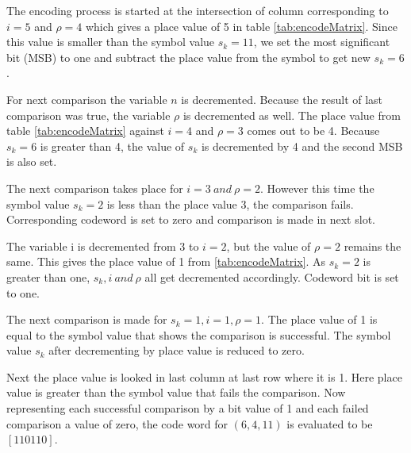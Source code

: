 \begin{list}{}{}
\item The encoding process is started at the intersection of column corresponding to $i=5$ and $\rho=4$ which gives a place value of 5 in table \ref{tab:encodeMatrix}. Since this value is smaller than the symbol value $s_k=11$, we set the most significant bit (MSB) to one and subtract the place value from the symbol to get new $s_k=6$. 

\item For next comparison the variable $n$ is decremented. Because the result of last comparison was true, the variable $\rho$ is decremented as well. The place value from table \ref{tab:encodeMatrix} against $i=4$ and $\rho=3$ comes out to be 4. Because $s_k=6$ is greater than 4, the value of $s_k$ is decremented by 4 and the second MSB is also set.

\item The next comparison takes place for $i=3~and~\rho=2$. However this time the symbol value $s_k=2$ is less than the place value 3, the comparison fails. Corresponding codeword is set to zero and comparison is made in next slot.

\item The variable i is decremented from 3 to $i=2$, but the value of $\rho=2$ remains the same. This gives the place value of 1 from  \ref{tab:encodeMatrix}. As $s_k=2$ is greater than one, $s_k,i~and~\rho$  all get decremented accordingly. Codeword bit is set to one.

\item The next comparison is made for $s_k=1,i=1,\rho=1$. The place value of 1 is equal to the symbol value that shows the comparison is successful. The symbol value $s_k$ after decrementing by place value is reduced to zero. 

\item Next the place value is looked in last column at last row where it is 1. Here place value is greater than the symbol value that fails the comparison. Now representing each successful comparison by a bit value of 1 and each failed comparison a value of zero, the code word for $(6,4,11)$ is evaluated to be $[1 1 0 1 1 0]$.

\end{list}

